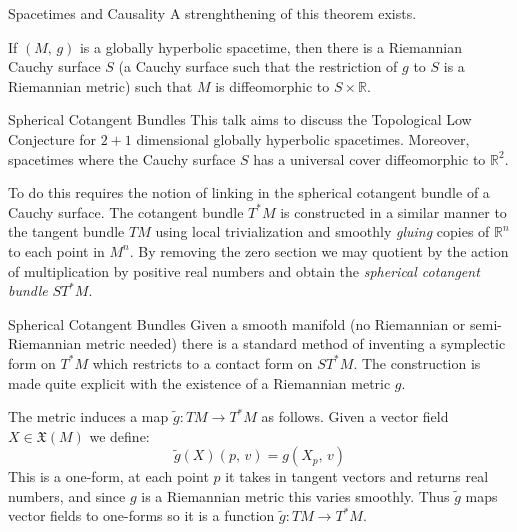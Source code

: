\documentclass{beamer}
\begin{document}
    \begin{frame}{Spacetimes and Causality}
        A strenghthening of this theorem exists.
        \begin{theorem}
            If $(M,\,g)$ is a globally hyperbolic spacetime, then there is a
            Riemannian Cauchy surface $S$ (a Cauchy surface such that the
            restriction of $g$ to $S$ is a Riemannian metric) such that
            $M$ is diffeomorphic to $S\times\mathbb{R}$.
        \end{theorem}
    \end{frame}
    \begin{frame}{Spherical Cotangent Bundles}
        This talk aims to discuss the Topological Low Conjecture
        for $2+1$ dimensional globally hyperbolic spacetimes. Moreover,
        spacetimes where the Cauchy surface $S$ has a universal cover
        diffeomorphic to $\mathbb{R}^{2}$.
        \par\hfill\par
        To do this requires the notion of linking in the spherical cotangent
        bundle of a Cauchy surface. The cotangent bundle $T^{*}M$ is
        constructed in a similar manner to the tangent bundle $TM$ using
        local trivialization and smoothly \textit{gluing} copies of
        $\mathbb{R}^{n}$ to each point in $M^{n}$. By removing the zero section
        we may quotient by the action of multiplication by positive real numbers
        and obtain the \textit{spherical cotangent bundle}
        $ST^{*}M$.
    \end{frame}
    \begin{frame}{Spherical Cotangent Bundles}
        Given a smooth manifold (no Riemannian or semi-Riemannian metric needed)
        there is a standard method of inventing a symplectic form on
        $T^{*}M$ which restricts to a contact form on $ST^{*}M$. The
        construction is made quite explicit with the existence of a
        Riemannian metric $g$.
        \par\hfill\par
        The metric induces a map $\tilde{g}:TM\rightarrow{T}^{*}M$ as follows.
        Given a vector field $X\in\mathfrak{X}(M)$ we define:
        \begin{equation}
            \tilde{g}(X)(p,\,v)=g(X_{p},\,v)
        \end{equation}
        This is a one-form, at each point $p$ it takes in tangent vectors and
        returns real numbers, and since $g$ is a Riemannian metric this varies
        smoothly. Thus $\tilde{g}$ maps vector fields to one-forms so it is
        a function $\tilde{g}:TM\rightarrow{T}^{*}M$.
    \end{frame}
\end{document}
